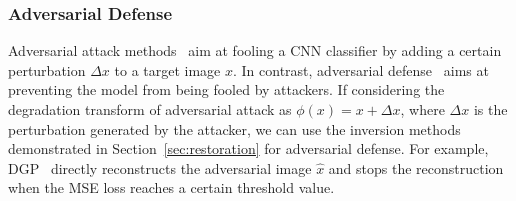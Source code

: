 \subsubsection{Adversarial Defense}
\label{sec:defense}
Adversarial attack methods~\cite{fan2020sparse,chen2020boosting,wu2020sapf,baluja2017adversarial} aim at fooling a CNN classifier by adding a certain perturbation $\Delta x$ to a target image $x$. 
In contrast, adversarial defense~\cite{samangouei2018defense,dhillon2018stochastic} aims at preventing the model from being fooled by attackers.
If considering the degradation transform of adversarial attack as $\phi(x)=x+\Delta x$, where $\Delta x$ is the perturbation generated by the attacker, we can use the inversion methods demonstrated in Section~\ref{sec:restoration} for adversarial defense.
For example, DGP~\cite{pan2020exploiting} directly reconstructs the adversarial image $\hat{x}$ and stops the reconstruction when the MSE loss reaches a certain threshold value.

\figdiffusion
